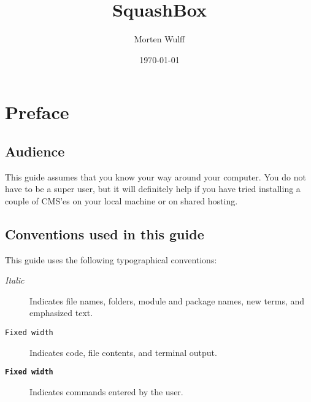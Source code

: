 \documentclass[ebook,10pt,twoside,openright]{memoir}
\title{SquashBox}
\author{Morten Wulff}
\date{\today}
\begin{document}
\frontmatter

\squashboxhalftitlepage{\thetitle}



\begingroup
{}
\tableofcontents*
\endgroup

\chapter{Preface}

\section*{Audience}

This guide assumes that you know your way around your computer. You do not have to be a super user, but it will definitely help if you have tried installing a couple of CMS'es on your local machine or on shared hosting.


\section*{Conventions used in this guide}

\begingroup
\setlength{\parindent}{0pt}

This guide uses the following typographical conventions:

\begin{squashboxsnugshade}
\begin{description}
\item[\normalfont\emph{Italic}] Indicates file names, folders, module and package names, new terms, and emphasized text.
\item[\normalfont\texttt{Fixed width}] Indicates code, file contents, and terminal output.
\item[\normalfont\textbf{\texttt{Fixed width}}] Indicates commands entered by the user.
\end{description}
\end{squashboxsnugshade}
\end{document}
